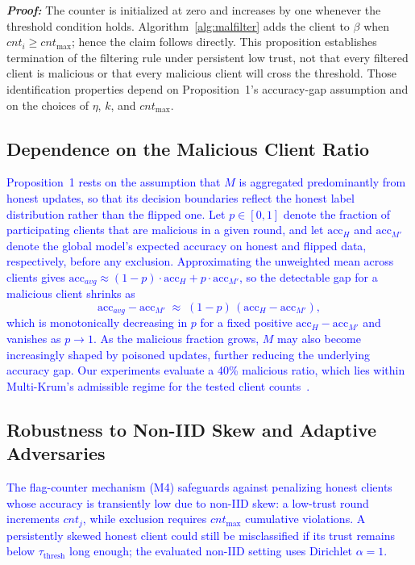 \documentclass[conference]{IEEEtran}
\begin{document}
\textit{\textbf{Proof:}} The counter is initialized at zero and increases by one whenever the threshold condition holds. Algorithm~\ref{alg:malfilter} adds the client to $\beta$ when $cnt_i\geq cnt_{\max}$; hence the claim follows directly. This proposition establishes termination of the filtering rule under persistent low trust, not that every filtered client is malicious or that every malicious client will cross the threshold. Those identification properties depend on Proposition~1's accuracy-gap assumption and on the choices of $\eta$, $k$, and $cnt_{\max}$.

\subsection{Dependence on the Malicious Client Ratio}
\label{sec:ratioanalysis}
\textcolor{blue}{Proposition~1 rests on the assumption that $M$ is aggregated predominantly from honest updates, so that its decision boundaries reflect the honest label distribution rather than the flipped one. Let $p \in [0,1]$ denote the fraction of participating clients that are malicious in a given round, and let $\text{acc}_H$ and $\text{acc}_{M'}$ denote the global model's expected accuracy on honest and flipped data, respectively, before any exclusion. Approximating the unweighted mean across clients gives $\text{acc}_{avg} \approx (1-p)\cdot \text{acc}_H + p \cdot \text{acc}_{M'}$, so the detectable gap for a malicious client shrinks as
\[
\text{acc}_{avg} - \text{acc}_{M'} \;\approx\; (1-p)\,(\text{acc}_H - \text{acc}_{M'}),
\]
which is monotonically decreasing in $p$ for a fixed positive $\text{acc}_H-\text{acc}_{M'}$ and vanishes as $p \to 1$. As the malicious fraction grows, $M$ may also become increasingly shaped by poisoned updates, further reducing the underlying accuracy gap. Our experiments evaluate a 40\% malicious ratio, which lies within Multi-Krum's admissible regime for the tested client counts~\cite{NIPS2017_f4b9ec30}.}

\subsection{Robustness to Non-IID Skew and Adaptive Adversaries}
\textcolor{blue}{The flag-counter mechanism (M4) safeguards against penalizing honest clients whose accuracy is transiently low due to non-IID skew: a low-trust round increments $cnt_j$, while exclusion requires $cnt_{\max}$ cumulative violations. A persistently skewed honest client could still be misclassified if its trust remains below $\tau_{\text{thresh}}$ long enough; the evaluated non-IID setting uses Dirichlet $\alpha=1$.}
\end{document}
